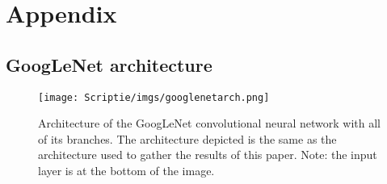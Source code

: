 \documentclass{uva-inf-bachelor-thesis}
\begin{document}
\appendix 

\printbibliography


\chapter{Appendix}
\newpage
\section{GoogLeNet architecture}
\begin{figure}[H]
\centering
\texttt{[image: Scriptie/imgs/googlenetarch.png]}
\caption{Architecture of the GoogLeNet convolutional neural network with all of its branches. The architecture depicted is the same as the architecture used to gather the results of this paper. Note: the input layer is at the bottom of the image.}
\end{figure}
\end{document}
